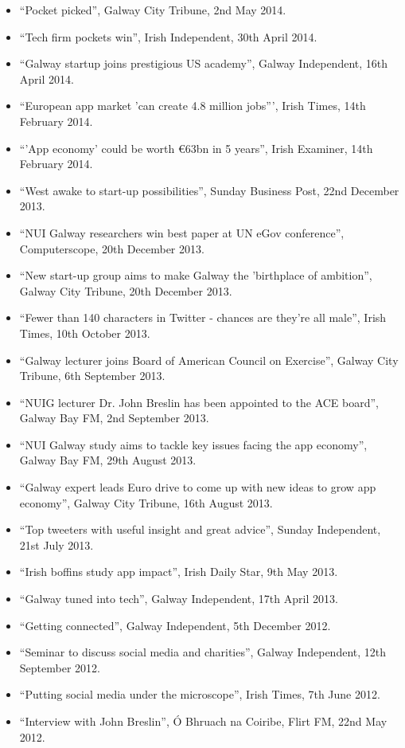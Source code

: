 \documentclass[10pt,a4paper]{res} %
\begin{document}
\begin{resume}
{\begin{itemize}
\item ``Pocket picked'', Galway City Tribune, 2nd May 2014.
\item ``Tech firm pockets win'', Irish Independent, 30th April 2014.
\item ``Galway startup joins prestigious US academy'', Galway Independent, 16th April 2014.
\item ``European app market 'can create 4.8 million jobs''', Irish Times, 14th February 2014.
\item ``'App economy' could be worth \euro{}63bn in 5 years'', Irish Examiner, 14th February 2014.
\item ``West awake to start-up possibilities'', Sunday Business Post, 22nd December 2013.
\item ``NUI Galway researchers win best paper at UN eGov conference'', Computerscope, 20th December 2013.
\item ``New start-up group aims to make Galway the 'birthplace of ambition'', Galway City Tribune, 20th December 2013.
\item ``Fewer than 140 characters in Twitter - chances are they're all male'', Irish Times, 10th October 2013.
\item ``Galway lecturer joins Board of American Council on Exercise'', Galway City Tribune, 6th September 2013.
\item ``NUIG lecturer Dr. John Breslin has been appointed to the ACE board'', Galway Bay FM, 2nd September 2013.
\item ``NUI Galway study aims to tackle key issues facing the app economy'', Galway Bay FM, 29th August 2013.
\item ``Galway expert leads Euro drive to come up with new ideas to grow app economy'', Galway City Tribune, 16th August 2013.
\item ``Top tweeters with useful insight and great advice'', Sunday Independent, 21st July 2013.
\item ``Irish boffins study app impact'', Irish Daily Star, 9th May 2013.
\item ``Galway tuned into tech'', Galway Independent, 17th April 2013.
\item ``Getting connected'', Galway Independent, 5th December 2012.
\item ``Seminar to discuss social media and charities'', Galway Independent, 12th September 2012.
\item ``Putting social media under the microscope'', Irish Times, 7th June 2012.
\item ``Interview with John Breslin'', \'{O} Bhruach na Coiribe, Flirt FM, 22nd May 2012.

\end{itemize}}
\end{resume}
\end{document}
